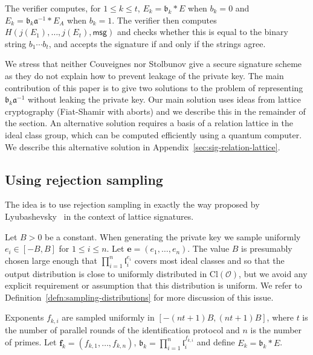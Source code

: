 \documentclass{llncs}
\newcommand{\OO}{\mathcal{O}}
\newcommand{\Cl}{\text{Cl}}
\newcommand{\msg}{\textsf{msg}}
\renewcommand{\a}{\mathfrak{a}}
\renewcommand{\b}{\mathfrak{b}}
\renewcommand{\l}{\mathfrak{l}}
\newcommand{\e}{\textbf{e}}
\newcommand{\f}{\textbf{f}}
\begin{document}
The verifier computes, for $1 \le k \le t$, $E_k = \b_k * E$ when $b_k = 0$ and $E_k = \b_k \a^{-1} * E_A$ when $b_k = 1$. The verifier then computes $H( j( E_1), \dots, j(E_t), \msg )$ and checks whether this is equal to the binary string $b_1\cdots b_t$, and accepts the signature if and only if the strings agree.


We stress that neither Couveignes nor Stolbunov give a secure signature scheme as they do not explain how to prevent leakage of the private key. The main contribution of this paper is to give two solutions to the problem of representing $\b_k \a^{-1}$ without leaking the private key.
Our main solution uses ideas from lattice cryptography (Fiat-Shamir with aborts) and we describe this in the remainder of the section.
An alternative solution requires a basis of a relation lattice in the ideal class group, which can be computed efficiently using a quantum computer. We describe this alternative solution in Appendix~\ref{sec:sig-relation-lattice}.





\subsection{Using rejection sampling}\label{sec:sig-reject-sample}

The idea is to use rejection sampling in exactly the way proposed by Lyubashevsky~\cite{Lyu09} in the context of lattice signatures.

Let $B > 0$ be a constant. When generating the private key we sample uniformly $e_i \in [-B, B]$ for $1 \le i \le n$. Let $\e = ( e_1, \dots, e_n )$.
The value $B$ is presumably chosen large enough that $\prod_{i=1}^n \l_i^{e_i}$ covers most ideal classes and so that the output distribution is close to uniformly distributed in $\Cl(\OO)$, but we avoid any explicit requirement or assumption that this distribution is uniform.
We refer to Definition~\ref{defn:sampling-distributions} for more discussion of this issue.

Exponents $f_{k,i}$ are sampled uniformly in $[-(nt+1)B, (nt+1)B]$, where $t$ is the number of parallel rounds of the identification protocol and $n$ is the number of primes.
Let $\f_k = (f_{k,1}, \dots, f_{k,n} )$, $\b_k = \prod_{i=1}^n \l_i^{f_{k,i}}$ and define $E_k = \b_k * E $.
\end{document}
